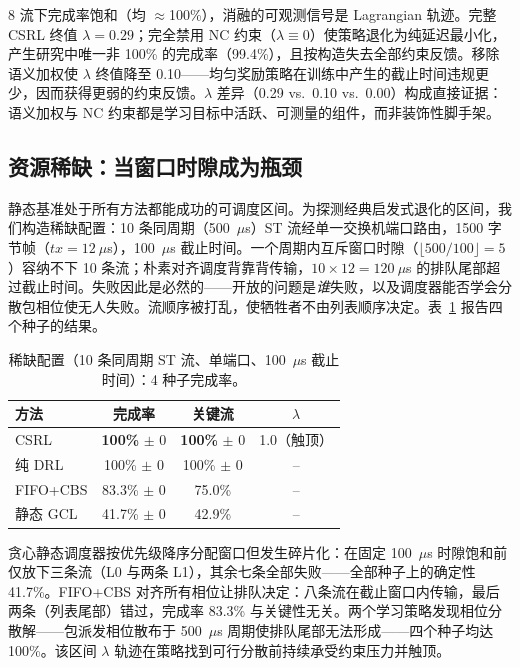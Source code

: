 \documentclass[UTF8]{ctexart}
\begin{document}
8 流下完成率饱和（均 $\approx$100\%），消融的可观测信号是 Lagrangian 轨迹。完整 CSRL 终值 $\lambda=0.29$；完全禁用 NC 约束（$\lambda\equiv0$）使策略退化为纯延迟最小化，产生研究中唯一非 100\% 的完成率（99.4\%），且按构造失去全部约束反馈。移除语义加权使 $\lambda$ 终值降至 0.10——均匀奖励策略在训练中产生的截止时间违规更少，因而获得更弱的约束反馈。$\lambda$ 差异（0.29 vs.\ 0.10 vs.\ 0.00）构成直接证据：语义加权与 NC 约束都是学习目标中活跃、可测量的组件，而非装饰性脚手架。

\subsection{资源稀缺：当窗口时隙成为瓶颈}

静态基准处于所有方法都能成功的可调度区间。为探测经典启发式退化的区间，我们构造稀缺配置：10 条同周期（500~$\mu$s）ST 流经单一交换机端口路由，1500 字节帧（$tx = 12~\mu$s），100~$\mu$s 截止时间。一个周期内互斥窗口时隙（$\lfloor 500/100 \rfloor = 5$）容纳不下 10 条流；朴素对齐调度背靠背传输，$10 \times 12 = 120~\mu$s 的排队尾部超过截止时间。失败因此是必然的——开放的问题是\textit{谁}失败，以及调度器能否学会分散包相位使无人失败。流顺序被打乱，使牺牲者不由列表顺序决定。表~\ref{tab:scarcity} 报告四个种子的结果。

\begin{table}[t]
\centering
\caption{稀缺配置（10 条同周期 ST 流、单端口、100~$\mu$s 截止时间）：4 种子完成率。}
\label{tab:scarcity}
\begin{tabular}{lccc}
\hline
\textbf{方法} & \textbf{完成率} & \textbf{关键流} & $\lambda$ \\
\hline
CSRL & \textbf{100\%} $\pm$ 0 & \textbf{100\%} $\pm$ 0 & 1.0（触顶） \\
纯 DRL & 100\% $\pm$ 0 & 100\% $\pm$ 0 & -- \\
FIFO+CBS & 83.3\% $\pm$ 0 & 75.0\% & -- \\
静态 GCL & 41.7\% $\pm$ 0 & 42.9\% & -- \\
\hline
\end{tabular}
\end{table}

贪心静态调度器按优先级降序分配窗口但发生碎片化：在固定 100~$\mu$s 时隙饱和前仅放下三条流（L0 与两条 L1），其余七条全部失败——全部种子上的确定性 41.7\%。FIFO+CBS 对齐所有相位让排队决定：八条流在截止窗口内传输，最后两条（列表尾部）错过，完成率 83.3\% 与关键性无关。两个学习策略发现相位分散解——包派发相位散布于 500~$\mu$s 周期使排队尾部无法形成——四个种子均达 100\%。该区间 $\lambda$ 轨迹在策略找到可行分散前持续承受约束压力并触顶。
\end{document}
